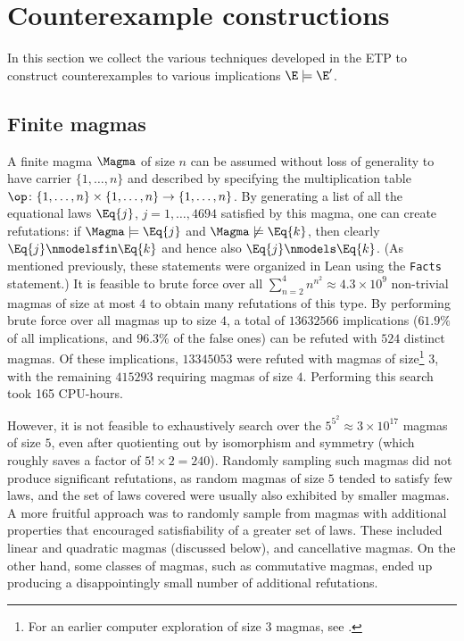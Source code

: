 
\section{Counterexample constructions}

In this section we collect the various techniques developed in the ETP to construct counterexamples to various implications $\E \models {\E'}$.

\subsection{Finite magmas}\label{finite-sec}

A finite magma $\Magma$ of size $n$ can be assumed without loss of generality to have carrier $\{1,\dots,n\}$ and described by specifying the multiplication table $\op \colon \{1,\dots,n\} \times \{1,\dots,n\} \to \{1,\dots,n\}$.  By generating a list of all the equational laws $\Eq{j}$, $j=1,\dots,4694$ satisfied by this magma, one can create refutations: if $\Magma \models \Eq{j}$ and $\Magma \not \models \Eq{k}$, then clearly $\Eq{j} \nmodelsfin \Eq{k}$ and hence also $\Eq{j} \nmodels \Eq{k}$.  (As mentioned previously, these statements were organized in Lean using the \texttt{Facts} statement.) It is feasible to brute force over all $\sum_{n=2}^4 n^{n^2} \approx 4.3 \times 10^9$ non-trivial magmas of size at most $4$ to obtain many refutations of this type.
By performing brute force over all magmas up to size $4$, a total of $\num{13632566}$ implications ($61.9\%$ of all implications, and $96.3\%$ of the false ones) can be refuted with $524$ distinct magmas. Of these implications, $\num{13345053}$ were refuted with magmas of size\footnote{For an earlier computer exploration of size $3$ magmas, see \cite{berman-burris}.} $3$, with the remaining $\num{415293}$ requiring magmas of size $4$. Performing this search took 165 CPU-hours.

However, it is not feasible to exhaustively search over the $5^{5^2} \approx 3 \times 10^{17}$ magmas of size $5$, even after quotienting out by isomorphism and symmetry (which roughly saves a factor of $5! \times 2 = 240$).  Randomly sampling such magmas did not produce significant refutations, as random magmas of size $5$ tended to satisfy few laws, and the set of laws covered were usually also exhibited by smaller magmas.  A more fruitful approach was to randomly sample from magmas with additional properties that encouraged satisfiability of a greater set of laws.  These included linear and quadratic magmas (discussed below), and cancellative magmas.  On the other hand, some classes of magmas, such as commutative magmas, ended up producing a disappointingly small number of additional refutations.

